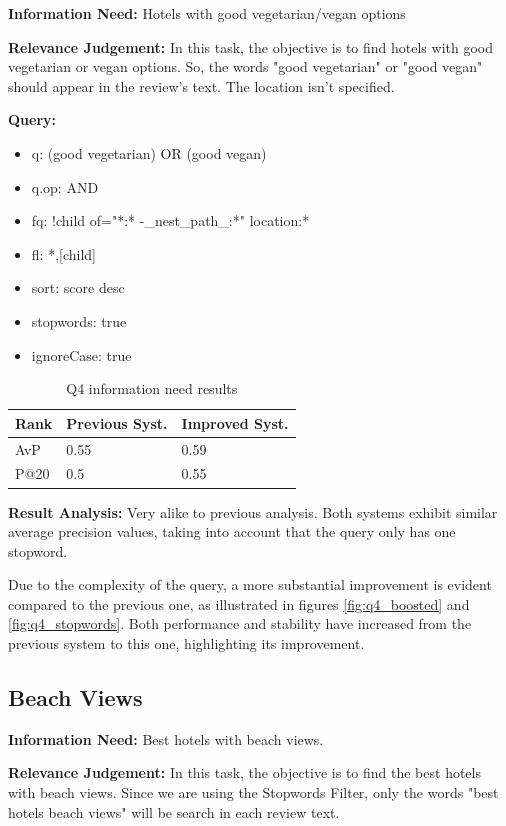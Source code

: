 \documentclass[sigconf]{acmart}
\begin{document}
\textbf{Information Need:} Hotels with good vegetarian/vegan options

\textbf{Relevance Judgement:} In this task, the objective is to find hotels with good vegetarian or vegan options. So, the words "good vegetarian" or "good vegan" should appear in the review's text. The location isn't specified.

\textbf{Query:}

\begin{itemize}
    \item q: (good vegetarian) OR (good vegan)
    \item q.op: AND
    \item fq: {!child of="*:* -\_nest\_path\_:*"} location:*
    \item fl: *,[child]
    \item sort: score desc
    \item stopwords: true
    \item ignoreCase: true
\end{itemize}

\begin{table}[H]
\caption{Q4 information need results}
\label{tab:q6}
\begin{tabular}{lll}
\toprule
Rank & Previous Syst. & Improved Syst.\\
\midrule
AvP & 0.55 & 0.59  \\
P@20 & 0.5 & 0.55 \\
\bottomrule
\end{tabular}
\end{table}

\textbf{Result Analysis:} Very alike to previous analysis. Both systems exhibit similar average precision values, taking into account that the query only has one stopword.

Due to the complexity of the query, a more substantial improvement is evident compared to the previous one, as illustrated in figures \ref{fig:q4_boosted} and \ref{fig:q4_stopwords}. Both performance and stability have increased from the previous system to this one, highlighting its improvement.

\subsection{Beach Views}

\textbf{Information Need:} Best hotels with beach views.

\textbf{Relevance Judgement:} In this task, the objective is to find the best hotels with beach views. Since we are using the Stopwords Filter, only the words "best hotels beach views" will be search in each review text.
\end{document}
